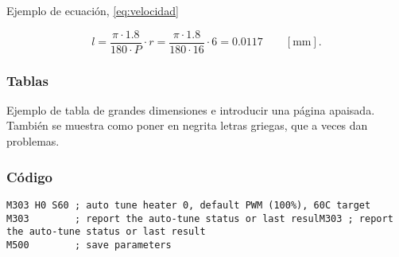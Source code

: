 Ejemplo de ecuación, \autoref{eq:velocidad}

\begin{equation}\label{eq:velocidad}
	l = \frac{\pi\cdot1.8}{180\cdot P}\cdot r = \frac{\pi\cdot1.8}{180\cdot16}\cdot 6 = 0.0117 \qquad [\mathrm{mm}].
\end{equation}




\subsubsection{Tablas}

Ejemplo de tabla de grandes dimensiones e introducir una página apaisada. También se muestra como poner en negrita letras griegas, que a veces dan problemas.

\begin{landscape}
    \vspace*{\fill}
    
    \vspace*{\fill}
    \clearpage
\end{landscape}



\subsubsection{Código}


\begin{lstlisting}
M303 H0 S60 ; auto tune heater 0, default PWM (100%), 60C target
M303        ; report the auto-tune status or last resulM303 ; report the auto-tune status or last result
M500        ; save parameters
\end{lstlisting}




